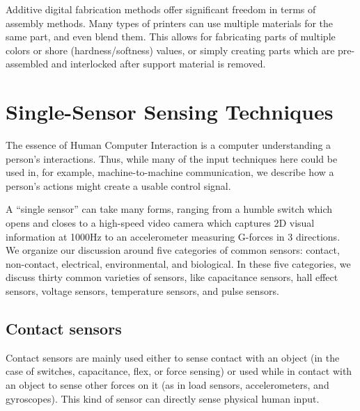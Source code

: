 Additive digital fabrication methods offer significant freedom in terms of assembly methods. Many types of printers can use multiple materials for the same part, and even blend them. This allows for fabricating parts of multiple colors or shore (hardness/softness) values, or simply creating parts which are pre-assembled and interlocked after support material is removed. 

\section{Single-Sensor Sensing Techniques}

The essence of Human Computer Interaction is a computer understanding a person's interactions. Thus, while many of the input techniques here could be used in, for example, machine-to-machine communication, we describe how a person's actions might create a usable control signal.

A ``single sensor'' can take many forms, ranging from a humble switch which opens and closes to a high-speed video camera which captures 2D visual information at 1000Hz to an accelerometer measuring G-forces in 3 directions.
We organize our discussion around five categories of common sensors: contact, non-contact, electrical, environmental, and biological. In these five categories, we discuss thirty common varieties of sensors, like capacitance sensors, hall effect sensors, voltage sensors, temperature sensors, and pulse sensors.

\subsection{Contact sensors}

Contact sensors are mainly used either to sense contact with an object (in the case of switches, capacitance, flex, or force sensing) or used while in contact with an object to sense other forces on it (as in load sensors, accelerometers, and gyroscopes). This kind of sensor can directly sense physical human input.

